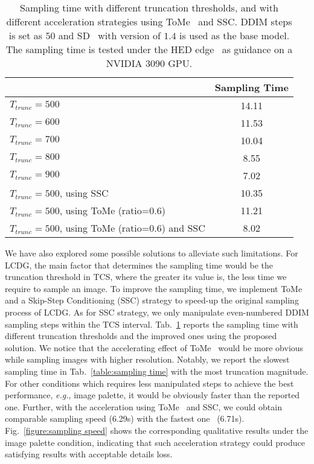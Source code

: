 \documentclass{article}
\begin{document}
\begin{table}[h]
  \centering
\caption{Sampling time with different truncation thresholds, and with different acceleration strategies using ToMe~\cite{bolya2022token} and SSC. DDIM steps is set as $50$ and SD~\cite{rombach2022high} with version of $1.4$ is used as the base model. The sampling time is tested under the HED edge~\cite{xie2015holistically} as guidance on a NVIDIA 3090 GPU.}
\begin{tabular}{lc}
   \toprule
   &Sampling Time\\
   \midrule 
   $T_{trunc}=500$    & 14.11 \\
   $T_{trunc}=600$    & 11.53 \\
   $T_{trunc}=700$    & 10.04 \\
   $T_{trunc}=800$    & 8.55 \\
   $T_{trunc}=900$    & 7.02 \\
   \midrule
   $T_{trunc}=500$, using SSC    & 10.35 \\
   $T_{trunc}=500$, using ToMe (ratio=$0.6$)    & 11.21 \\
   $T_{trunc}=500$, using ToMe (ratio=$0.6$) and SSC    & 8.02 \\
\bottomrule
\end{tabular}
  \label{table:sampling time with acceleration}
\end{table}


We have also explored some possible solutions to alleviate such limitations. For LCDG, the main factor that determines the sampling time would be the truncation threshold in TCS, where the greater its value is, the less time we require to sample an image. To improve the sampling time, we implement ToMe~\cite{bolya2022token} and a Skip-Step Conditioning (SSC) strategy to speed-up the original sampling process of LCDG. As for SSC strategy, we only manipulate even-numbered DDIM sampling steps within the TCS interval. Tab.~\ref{table:sampling time with acceleration} reports the sampling time with different truncation thresholds and the improved ones using the proposed solution. We notice that the accelerating effect of ToMe~\cite{bolya2022token} would be more obvious while sampling images with higher resolution. Notably, we report the slowest sampling time in Tab.~\ref{table:sampling time} with the most truncation magnitude. For other conditions which requires less manipulated steps to achieve the best performance, \textit{e.g.}, image palette, it would be obviously faster than the reported one. Further, with the acceleration using ToMe~\cite{bolya2022token} and SSC, we could obtain comparable sampling speed (6.29s) with the fastest one~\cite{mou2023t2i} (6.71s). Fig.~\ref{figure:sampling speed} shows the corresponding qualitative results under the image palette condition, indicating that such acceleration strategy could produce satisfying results with acceptable details loss.
\end{document}
